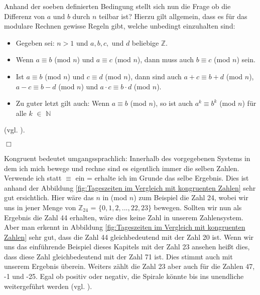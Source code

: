 \documentclass[german,12pt,a4paper]{article}
\begin{document}
Anhand der soeben definierten Bedingung stellt sich nun die Frage ob die Differenz von $a$ und $b$ durch $n$ teilbar ist?
Hierzu gilt allgemein, dass es für das modulare Rechnen gewisse Regeln gibt, welche unbedingt einzuhalten sind:
\begin{itemize}
    \item Gegeben sei: $n>1$ und $a, b, c,$ und $d$ beliebige $\mathbb{Z}$.
    \item Wenn $a\equiv b$ (mod $n$) und $a\equiv c$ (mod $n$), dann muss auch $b\equiv c$ (mod $n$) sein.
    \item Ist $a\equiv b$ (mod $n$) und $c\equiv d$ (mod $n$), dann sind auch $a + c\equiv b + d$ (mod $n$), $a - c\equiv b - d$ (mod $n$) und $a \cdot c\equiv b \cdot d$ (mod $n$).
    \item Zu guter letzt gilt auch: Wenn $a\equiv b$ (mod $n$), so ist auch $a^k\equiv b^k$ (mod $n$) für alle $k$ $\in$ $\mathbb{N}$
\end{itemize}
(vgl. \cite[66]{RempeGillen2009}).
\begin{flushright}
$\Box$
\end{flushright}


Kongruent bedeutet umgangssprachlich:
Innerhalb des vorgegebenen Systems in dem ich mich bewege und rechne sind es eigentlich immer die selben Zahlen.
Verwende ich statt $\equiv$ ein = erhalte ich im Grunde das selbe Ergebnis.
Dies ist anhand der Abbildung \ref{fig:Tageszeiten im Vergleich mit kongruenten Zahlen} sehr gut ersichtlich.
Hier wäre das $n$ in (mod $n$) zum Beispiel die Zahl 24, wobei wir uns in jener Menge von $\mathbb{Z}_{24}$ = $\{0, 1, 2, ..., 22, 23\}$ bewegen.
Sollten wir nun als Ergebnis die Zahl 44 erhalten, wäre dies keine Zahl in unserem Zahlensystem.
Aber man erkennt in Abbildung \ref{fig:Tageszeiten im Vergleich mit kongruenten Zahlen} sehr gut, dass die Zahl 44 gleichbedeutend mit der Zahl 20 ist.
Wenn wir uns das einführende Beispiel dieses Kapitels mit der Zahl 23 ansehen heißt dies, dass diese Zahl gleichbedeutend mit der Zahl 71 ist.
Dies stimmt auch mit unserem Ergebnis überein.
Weiters zählt die Zahl 23 aber auch für die Zahlen 47, -1 und -25.
Egal ob positiv oder negativ, die Spirale könnte bis ins unendliche weitergeführt werden (vgl. \cite[298--299]{Meinel2011}).
\end{document}
